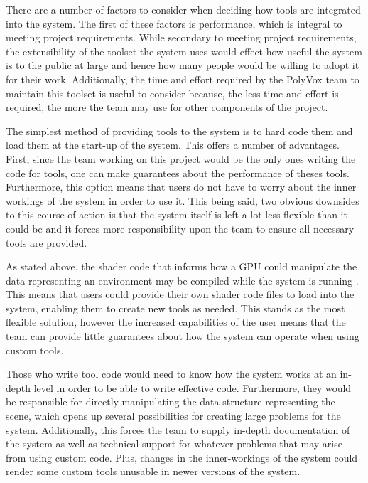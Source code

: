 \documentclass[onecolumn, draftclsnofoot,10pt, compsoc]{IEEEtran}
\newcounter{threesection}[subsubsection]
\begin{document}

There are a number of factors to consider when deciding how tools are integrated into the system.
The first of these factors is performance, which is integral to meeting project requirements.
While secondary to meeting project requirements, the extensibility of the toolset the system uses would effect how useful the system is to the public at large and hence how many people would be willing to adopt it for their work.
Additionally, the time and effort required by the PolyVox team to maintain this toolset is useful to consider because, the less time and effort is required, the more the team may use for other components of the project.



The simplest method of providing tools to the system is to hard code them and load them at the start-up of the system.
This offers a number of advantages.
First, since the team working on this project would be the only ones writing the code for tools, one can make guarantees about the performance of theses tools.
Furthermore, this option means that users do not have to worry about the inner workings of the system in order to use it.
This being said, two obvious downsides to this course of action is that the system itself is left a lot less flexible than it could be and it forces more responsibility upon the team to ensure all necessary tools are provided.



As stated above, the shader code that informs how a GPU could manipulate the data representing an environment may be compiled while the system is running \cite{4}.
This means that users could provide their own shader code files to load into the system, enabling them to create new tools as needed.
This stands as the most flexible solution, however the increased capabilities of the user means that the team can provide little guarantees about how the system can operate when using custom tools.

Those who write tool code would need to know how the system works at an in-depth level in order to be able to write effective code.
Furthermore, they would be responsible for directly manipulating the data structure representing the scene, which opens up several possibilities for creating large problems for the system.
Additionally, this forces the team to supply in-depth documentation of the system as well as technical support for whatever problems that may arise from using custom code.
Plus, changes in the inner-workings of the system could render some custom tools unusable in newer versions of the system.
\end{document}
